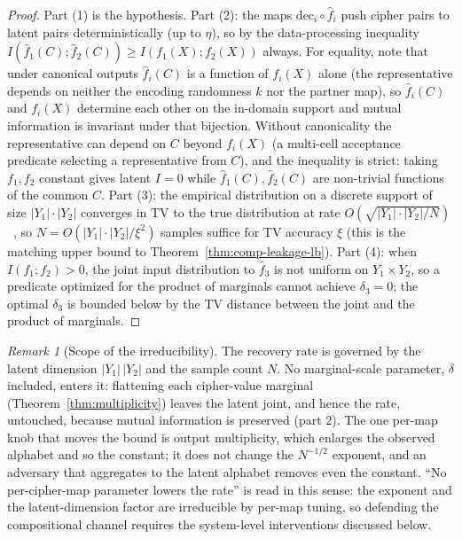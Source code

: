 \documentclass[11pt]{article}
\theoremstyle{definition}
\theoremstyle{plain}
\theoremstyle{remark}
\newtheorem{remark}{Remark}[section]
\newcommand{\fhat}{\hat{f}}
\newcommand{\dec}{\mathrm{dec}}
\begin{document}
\begin{proof}
Part (1) is the hypothesis.
Part (2): the maps $\dec_i \circ \fhat_i$ push cipher pairs to latent
pairs deterministically (up to $\eta$), so by the data-processing
inequality $I(\fhat_1(C); \fhat_2(C)) \geq I(f_1(X); f_2(X))$ always.
For equality, note that under canonical outputs $\fhat_i(C)$ is a
function of $f_i(X)$ alone (the representative depends on neither the
encoding randomness $k$ nor the partner map), so $\fhat_i(C)$ and
$f_i(X)$ determine each other on the in-domain support and mutual
information is invariant under that bijection.  Without canonicality the
representative can depend on $C$ beyond $f_i(X)$ (a multi-cell acceptance
predicate selecting a representative from $C$), and the inequality is
strict: taking $f_1, f_2$ constant gives latent $I = 0$ while
$\fhat_1(C), \fhat_2(C)$ are non-trivial functions of the common $C$.
Part (3): the empirical distribution on a discrete support of size
$|Y_1| \cdot |Y_2|$ converges in TV to the true distribution at rate
$O(\sqrt{|Y_1|\cdot|Y_2|/N})$~\cite{devroye1996nonparametric}, so
$N = O(|Y_1|\cdot|Y_2|/\xi^2)$ samples suffice for TV accuracy $\xi$
(this is the matching upper bound to Theorem~\ref{thm:comp-leakage-lb}).
Part (4): when $I(f_1; f_2) > 0$, the joint input distribution to
$\fhat_3$ is not uniform on $Y_1 \times Y_2$, so a predicate optimized
for the product of marginals cannot achieve $\delta_3 = 0$; the
optimal $\delta_3$ is bounded below by the TV distance between the
joint and the product of marginals.
\end{proof}

\begin{remark}[Scope of the irreducibility]
\label{rem:irreducibility}
The recovery rate is governed by the latent dimension $|Y_1|\,|Y_2|$ and
the sample count $N$.  No marginal-scale parameter, $\delta$ included,
enters it: flattening each cipher-value marginal
(Theorem~\ref{thm:multiplicity}) leaves the latent joint, and hence the
rate, untouched, because mutual information is preserved (part 2).  The
one per-map knob that moves the bound is output multiplicity, which
enlarges the observed alphabet and so the constant; it does not change
the $N^{-1/2}$ exponent, and an adversary that aggregates to the latent
alphabet removes even the constant.  ``No per-cipher-map parameter lowers
the rate'' is read in this sense: the exponent and the latent-dimension
factor are irreducible by per-map tuning, so defending the compositional
channel requires the system-level interventions discussed below.
\end{remark}
\end{document}
